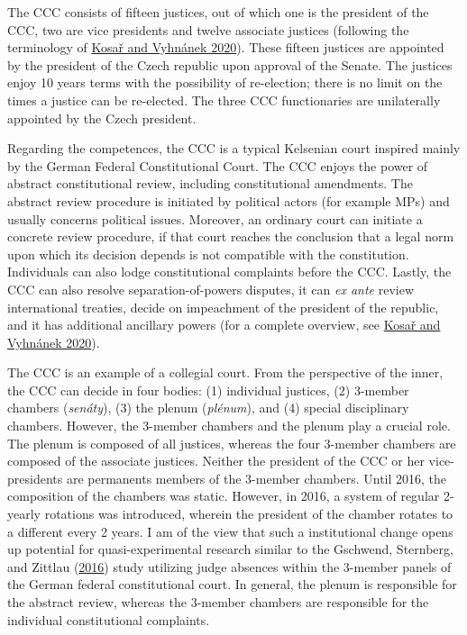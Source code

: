\documentclass[
  11pt,
]{article}
\begin{document}
The CCC consists of fifteen justices, out of which one is the president
of the CCC, two are vice presidents and twelve associate justices
(following the terminology of
\protect\hyperlink{ref-kosarConstitutionalCourtCzechia2020}{Kosař and
Vyhnánek 2020}). These fifteen justices are appointed by the president
of the Czech republic upon approval of the Senate. The justices enjoy 10
years terms with the possibility of re-election; there is no limit on
the times a justice can be re-elected. The three CCC functionaries are
unilaterally appointed by the Czech president.

Regarding the competences, the CCC is a typical Kelsenian court inspired
mainly by the German Federal Constitutional Court. The CCC enjoys the
power of abstract constitutional review, including constitutional
amendments. The abstract review procedure is initiated by political
actors (for example MPs) and usually concerns political issues.
Moreover, an ordinary court can initiate a concrete review procedure, if
that court reaches the conclusion that a legal norm upon which its
decision depends is not compatible with the constitution. Individuals
can also lodge constitutional complaints before the CCC. Lastly, the CCC
can also resolve separation-of-powers disputes, it can \emph{ex ante}
review international treaties, decide on impeachment of the president of
the republic, and it has additional ancillary powers (for a complete
overview, see
\protect\hyperlink{ref-kosarConstitutionalCourtCzechia2020}{Kosař and
Vyhnánek 2020}).

The CCC is an example of a collegial court. From the perspective of the
inner, the CCC can decide in four bodies: (1) individual justices, (2)
3-member chambers (\emph{senáty}), (3) the plenum (\emph{plénum}), and
(4) special disciplinary chambers. However, the 3-member chambers and
the plenum play a crucial role. The plenum is composed of all justices,
whereas the four 3-member chambers are composed of the associate
justices. Neither the president of the CCC or her vice-presidents are
permanents members of the 3-member chambers. Until 2016, the composition
of the chambers was static. However, in 2016, a system of regular
2-yearly rotations was introduced, wherein the president of the chamber
rotates to a different every 2 years. I am of the view that such a
institutional change opens up potential for quasi-experimental research
similar to the Gschwend, Sternberg, and Zittlau
(\protect\hyperlink{ref-gschwendAreJudgesPolitical2016}{2016}) study
utilizing judge absences within the 3-member panels of the German
federal constitutional court. In general, the plenum is responsible for
the abstract review, whereas the 3-member chambers are responsible for
the individual constitutional complaints.
\end{document}
